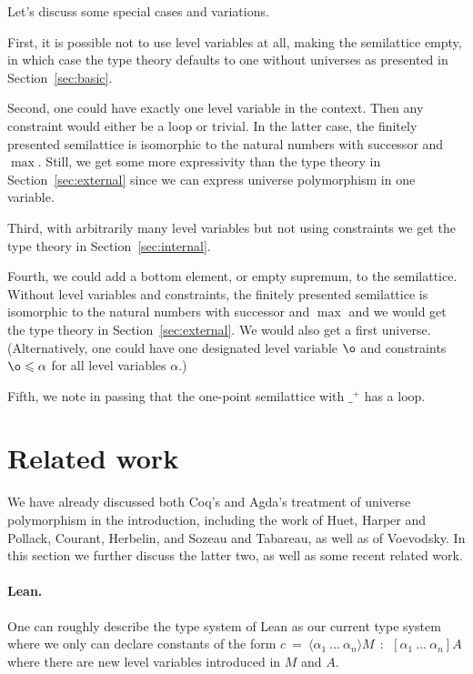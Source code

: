 \documentclass[a4paper,UKenglish,cleveref, autoref, thm-restate]{lipics-v2021}
\newcommand{\lam}[1]{{\langle}#1{\rangle}}
\begin{document}
\begin{remark}
Let's discuss some special cases and variations.

First, it is possible not to use
level variables at all, making the semilattice empty,
in which case the type theory defaults to one without universes
as presented in Section~\ref{sec:basic}.

Second, one could have exactly one level variable in the context.
Then any constraint would either be a loop or trivial.
In the latter case, the finitely presented semilattice
is isomorphic to the natural numbers with successor and $\max$.
Still, we get some more
expressivity than the type theory in Section~\ref{sec:external} since
we can express universe polymorphism in one variable.

Third, with arbitrarily many level variables but not using constraints
we get the type theory in Section~\ref{sec:internal}.

Fourth, we could add a bottom element, or empty supremum, to the semilattice.
Without level variables and constraints, the finitely presented semilattice
is isomorphic to the natural numbers with successor and $\max$
and we would get the type theory in Section~\ref{sec:external}.
We would also get a first universe.
(Alternatively, one could have one designated level variable
$\o$ and constraints $\o\leqslant\alpha$
for all level variables $\alpha$.)

Fifth, we note in passing that the one-point semilattice
with $\_^+$ has a loop.
\end{remark}

\section{Related work}\label{sec:related}

We have already discussed both Coq's and Agda's treatment of universe polymorphism in the introduction, including the work of Huet, Harper and Pollack, Courant, Herbelin, and Sozeau and Tabareau, as well as of Voevodsky. In this section we further
discuss the latter two, as well as some recent related work.

\paragraph{Lean.}

One can roughly describe the type system of Lean \cite{moura:lean,Carneiro19} as our current type system
where we only can declare constants of the form
$c~=~\lam{\alpha_1~\dots~\alpha_n}M~~:~~[\alpha_1~\dots~\alpha_n]A$ where there are new level variables introduced in $M$ and
$A$.
\end{document}
